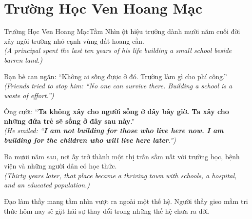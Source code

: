 \section{Trường Học Ven Hoang Mạc}
\begin{truyen}{Trường Học Ven Hoang Mạc}{Tầm Nhìn}
ột hiệu trưởng dành mười năm cuối đời xây ngôi trường nhỏ cạnh vùng đất hoang cằn.\\
\textit{(A principal spent the last ten years of his life building a small school beside barren land.)}

Bạn bè can ngăn: ``Không ai sống được ở đó. Trường làm gì cho phí công.''\\
\textit{(Friends tried to stop him: ``No one can survive there. Building a school is a waste of effort.'')}

Ông cười: ``\textbf{Ta không xây cho người sống ở đây bây giờ. Ta xây cho những đứa trẻ sẽ sống ở đây sau này}.''\\
\textit{(He smiled: ``\textbf{I am not building for those who live here now. I am building for the children who will live here later}.'')}

Ba mươi năm sau, nơi ấy trở thành một thị trấn sầm uất với trường học, bệnh viện và những người dân có học thức.\\
\textit{(Thirty years later, that place became a thriving town with schools, a hospital, and an educated population.)}
\end{truyen}
\begin{baihoc}
  Đạo làm thầy mang tầm nhìn vượt ra ngoài một thế hệ. Người thầy gieo mầm tri thức hôm nay sẽ gặt hái sự thay đổi trong những thế hệ chưa ra đời.
\end{baihoc}
